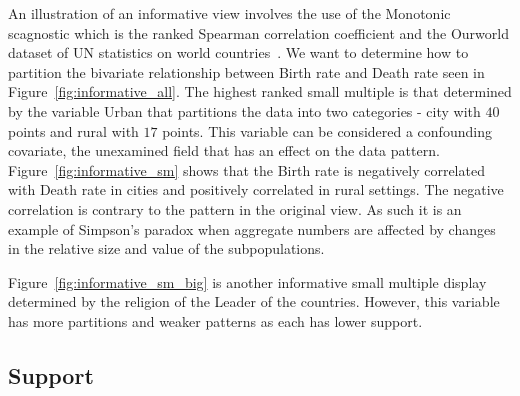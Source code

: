 An illustration of an informative view involves the use of the Monotonic scagnostic  which is the ranked Spearman correlation coefficient and the Ourworld dataset of UN statistics on world countries~\cite{Wilkinson2005GG,Wilkinson2008}. We want to determine how to partition the bivariate relationship between Birth rate and Death rate seen in Figure~\ref{fig:informative_all}. The highest ranked small multiple is that determined by the variable Urban that partitions the data into two categories - city with $40$ points and rural with $17$ points. This variable can be considered a confounding covariate, the unexamined field that has an effect on the data pattern. Figure~\ref{fig:informative_sm} shows that the Birth rate is negatively correlated with Death rate in cities and positively correlated in rural settings. The negative correlation is contrary to the pattern in the original view. As such it is an example of Simpson's paradox when aggregate numbers are affected by changes in the relative size and value of the subpopulations. 
 
Figure~\ref{fig:informative_sm_big} is another informative small multiple display determined by the religion of the Leader of the countries. However, this variable has more partitions and weaker patterns as each has lower support. 

\subsection{Support}

